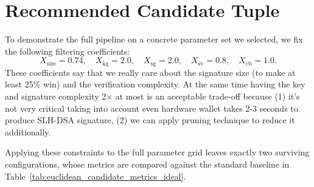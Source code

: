 \section{Recommended Candidate Tuple} \label{sec:ideal-examples}

To demonstrate the full pipeline on a concrete parameter set we selected, we fix the following filtering coefficients:
\begin{equation*}
    X_{\text{size}} = 0.74, \quad X_{\text{kg}} = 2.0, \quad X_{\text{sg}} = 2.0,
    \quad X_{\text{sv}} = 0.8, \quad X_{\text{cb}} = 1.0.
\end{equation*}
These coefficients say that we really care about the signature size (to make at least 25\% win) and the verification complexity. At the same time having the key and signature complexity 2$\times$ at most is an acceptable trade-off because (1) it's not very critical taking into account even hardware wallet takes 2-3 seconds to produce SLH-DSA signature, (2) we can apply pruning technique \cite{conduition-blog} to reduce it additionally.  

Applying these constraints to the full parameter grid leaves exactly two surviving configurations, whose metrics are compared against the standard baseline in Table~\ref{tab:euclidean_candidate_metrics_ideal}.

\begin{table}[htbp]
\centering
\small
\raggedright
\caption{Performance Comparison between the Standard Baseline and the Two Evaluated Candidates}
\label{tab:euclidean_candidate_metrics_ideal}
\end{table}

